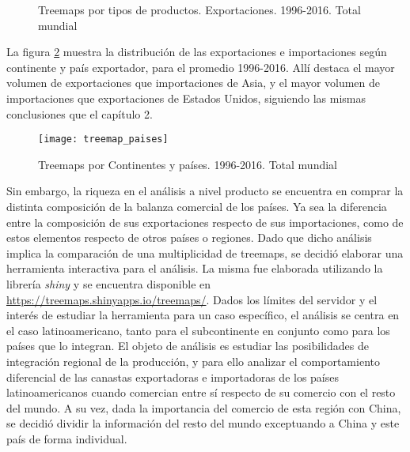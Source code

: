 \documentclass[class=article, crop=false]{standalone}
\begin{document}
	\begin{figure}
		\centering
		\caption{Treemaps por tipos de productos. Exportaciones. 1996-2016. Total mundial}
		\label{fig:treemaps_global}
	\end{figure}
	
	
	
	La figura \ref{fig:treemaps_global_paises} muestra la distribución de las exportaciones e importaciones según continente y país exportador, para el promedio 1996-2016. Allí destaca el mayor volumen de exportaciones que importaciones de Asia, y el mayor volumen de importaciones que exportaciones de Estados Unidos, siguiendo las mismas conclusiones que el capítulo 2. 
	
	
	\begin{figure}
		\centering
		\texttt{[image: treemap\_paises]}
		\caption{Treemaps por Continentes y países. 1996-2016. Total mundial}
				\label{fig:treemaps_global_paises}
	\end{figure}
	
	
	Sin embargo, la riqueza en el análisis a nivel producto se encuentra en comprar la distinta composición de la balanza comercial de los países. Ya sea la diferencia entre la composición de sus exportaciones respecto de sus importaciones, como de estos elementos respecto de otros países o regiones. Dado que dicho análisis implica la comparación de una multiplicidad de treemaps, se decidió elaborar una herramienta interactiva para el análisis. La misma fue elaborada utilizando la librería \textit{shiny} \citep{Chang2018} y se encuentra disponible en \hyperlink{https://treemaps.shinyapps.io/treemaps/}{https://treemaps.shinyapps.io/treemaps/}. Dados los límites del servidor y el interés de estudiar la herramienta para un caso específico, el análisis se centra en el caso latinoamericano, tanto para el subcontinente en conjunto como para los países que lo integran. El objeto de análisis es estudiar las posibilidades de integración regional de la producción, y para ello analizar el comportamiento diferencial de las canastas exportadoras e importadoras de los países latinoamericanos cuando comercian entre sí respecto de su comercio con el resto del mundo. A su vez, dada la importancia del comercio de esta región con China, se decidió dividir la información del resto del mundo exceptuando a China y este país de forma individual.
	
\end{document}
